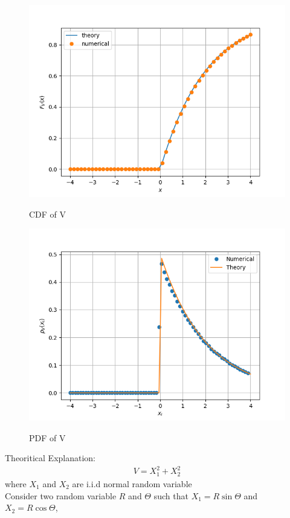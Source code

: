 \documentclass[journal,12pt,twocolumn]{IEEEtran}
\renewcommand\thesection{\arabic{section}}
\begin{document}
\begin{enumerate}[label=\thesection.\arabic*.,ref=\thesection.\theenumi]
\begin{figure}[H]
    \includegraphics[scale = 0.6]{./figs/6.1_cdf.png}
    \label{6.1.1}
    \caption{CDF of V}
\end{figure}
\begin{figure}[H]
    \includegraphics[scale = 0.6]{./figs/6.1_pdf.png}
    \label{6.1.2}
    \caption{PDF of V}
\end{figure}
Theoritical Explanation:
\begin{align}
    V=X_1^2+X_2^2
\end{align}
where $X_1$ and $X_2$ are i.i.d normal random variable \\
Consider two random variable $R$ and $\Theta$ such that $X_1 = R \sin \Theta$ and $X_2 = R \cos \Theta$,\\

\end{enumerate}
\end{document}
